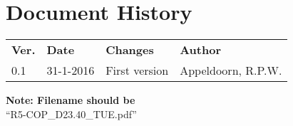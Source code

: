 \section*{Document History}

\begin{tabular}{|p{1cm}|p{2cm}|p{7.3cm}|p{4cm}|}
\hline
\rowcolor[gray]{0.8}
\multicolumn{4}{|l|}{\bf Document History}\\
\hline
\rowcolor[gray]{0.8}
\bf Ver. & \bf Date & \bf Changes & \bf Author\\
\hline
0.1 
	& 31-1-2016
	& First version
	& Appeldoorn, R.P.W.
	\\
\hline
\end{tabular}

\vfill
\textbf{Note: Filename should be}\\ 
“R5-COP\_D23.40\_TUE.pdf”

\vfill\eject

